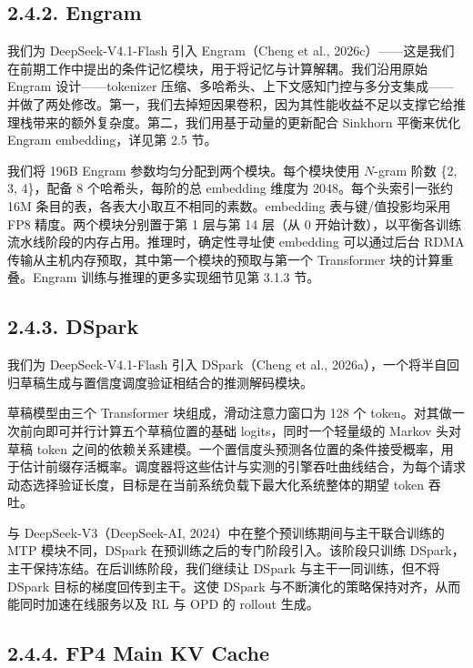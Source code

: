 \subsection{2.4.2. Engram}\label{engram}

我们为 DeepSeek-V4.1-Flash 引入 Engram（Cheng et al., 2026c）——这是我们在前期工作中提出的条件记忆模块，用于将记忆与计算解耦。我们沿用原始 Engram 设计——tokenizer 压缩、多哈希头、上下文感知门控与多分支集成——并做了两处修改。第一，我们去掉短因果卷积，因为其性能收益不足以支撑它给推理栈带来的额外复杂度。第二，我们用基于动量的更新配合 Sinkhorn 平衡来优化 Engram embedding，详见第 2.5 节。

我们将 196B Engram 参数均匀分配到两个模块。每个模块使用 \(N\)-gram 阶数 \{2, 3, 4\}，配备 8 个哈希头，每阶的总 embedding 维度为 2048。每个头索引一张约 16M 条目的表，各表大小取互不相同的素数。embedding 表与键/值投影均采用 FP8 精度。两个模块分别置于第 1 层与第 14 层（从 0 开始计数），以平衡各训练流水线阶段的内存占用。推理时，确定性寻址使 embedding 可以通过后台 RDMA 传输从主机内存预取，其中第一个模块的预取与第一个 Transformer 块的计算重叠。Engram 训练与推理的更多实现细节见第 3.1.3 节。

\subsection{2.4.3. DSpark}\label{dspark}

我们为 DeepSeek-V4.1-Flash 引入 DSpark（Cheng et al., 2026a），一个将半自回归草稿生成与置信度调度验证相结合的推测解码模块。

草稿模型由三个 Transformer 块组成，滑动注意力窗口为 128 个 token。对其做一次前向即可并行计算五个草稿位置的基础 logits，同时一个轻量级的 Markov 头对草稿 token 之间的依赖关系建模。一个置信度头预测各位置的条件接受概率，用于估计前缀存活概率。调度器将这些估计与实测的引擎吞吐曲线结合，为每个请求动态选择验证长度，目标是在当前系统负载下最大化系统整体的期望 token 吞吐。

与 DeepSeek-V3（DeepSeek-AI, 2024）中在整个预训练期间与主干联合训练的 MTP 模块不同，DSpark 在预训练之后的专门阶段引入。该阶段只训练 DSpark，主干保持冻结。在后训练阶段，我们继续让 DSpark 与主干一同训练，但不将 DSpark 目标的梯度回传到主干。这使 DSpark 与不断演化的策略保持对齐，从而能同时加速在线服务以及 RL 与 OPD 的 rollout 生成。

\subsection{2.4.4. FP4 Main KV Cache}\label{fp4-main-kv-cache}

